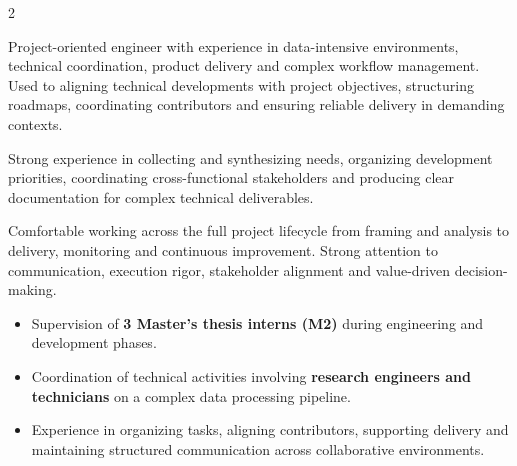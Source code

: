 \documentclass[8pt,a4paper,ragged2e,withhyper]{altacv}
\begin{document}
\begin{paracol}{2}

Project-oriented engineer with experience in data-intensive environments, technical coordination, product delivery and complex workflow management. Used to aligning technical developments with project objectives, structuring roadmaps, coordinating contributors and ensuring reliable delivery in demanding contexts.

Strong experience in collecting and synthesizing needs, organizing development priorities, coordinating cross-functional stakeholders and producing clear documentation for complex technical deliverables.

Comfortable working across the full project lifecycle from framing and analysis to delivery, monitoring and continuous improvement. Strong attention to communication, execution rigor, stakeholder alignment and value-driven decision-making.


\begin{itemize}
  \item Supervision of \textbf{3 Master’s thesis interns (M2)} during engineering and development phases.
  \item Coordination of technical activities involving \textbf{research engineers and technicians} on a complex data processing pipeline.
  \item Experience in organizing tasks, aligning contributors, supporting delivery and maintaining structured communication across collaborative environments.
\end{itemize}

\divider
{}
\divider

\medskip

\divider

\divider

\divider



\end{paracol}
\end{document}
